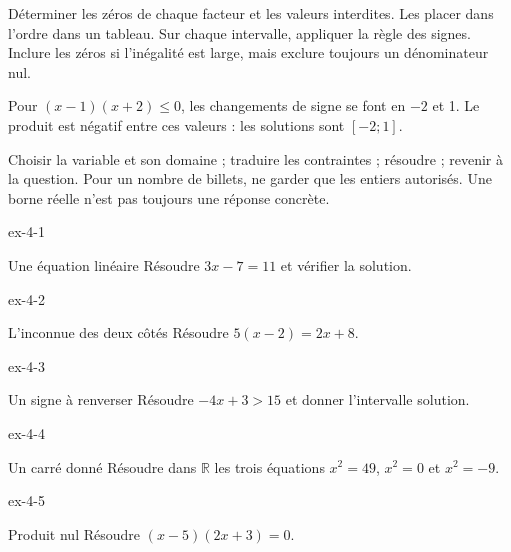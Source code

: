 \begin{savoirfaire}
Déterminer les zéros de chaque facteur et les valeurs interdites. Les placer dans l’ordre dans un tableau. Sur chaque intervalle, appliquer la règle des signes. Inclure les zéros si l’inégalité est large, mais exclure toujours un dénominateur nul.
\end{savoirfaire}
\begin{exemple}
Pour $(x-1)(x+2)\le0$, les changements de signe se font en $-2$ et 1. Le produit est négatif entre ces valeurs : les solutions sont $[-2;1]$.
\end{exemple}
\begin{savoirfaire}[Modéliser]
Choisir la variable et son domaine ; traduire les contraintes ; résoudre ; revenir à la question. Pour un nombre de billets, ne garder que les entiers autorisés. Une borne réelle n’est pas toujours une réponse concrète.
\end{savoirfaire}
\clearpage{}
\begin{blocLivre}{ex-4-1}
\begin{exercice}[1]{Une équation linéaire}
Résoudre $3x-7=11$ et vérifier la solution.
\end{exercice}
\end{blocLivre}
\begin{blocLivre}{ex-4-2}
\begin{exercice}[1]{L’inconnue des deux côtés}
Résoudre $5(x-2)=2x+8$.
\end{exercice}
\end{blocLivre}
\begin{blocLivre}{ex-4-3}
\begin{exercice}[1]{Un signe à renverser}
Résoudre $-4x+3>15$ et donner l’intervalle solution.
\end{exercice}
\end{blocLivre}
\begin{blocLivre}{ex-4-4}
\begin{exercice}[1]{Un carré donné}
Résoudre dans $\mathbb R$ les trois équations $x^2=49$, $x^2=0$ et $x^2=-9$.
\end{exercice}
\end{blocLivre}
\begin{blocLivre}{ex-4-5}
\begin{exercice}[1]{Produit nul}
Résoudre $(x-5)(2x+3)=0$.
\end{exercice}
\end{blocLivre}

